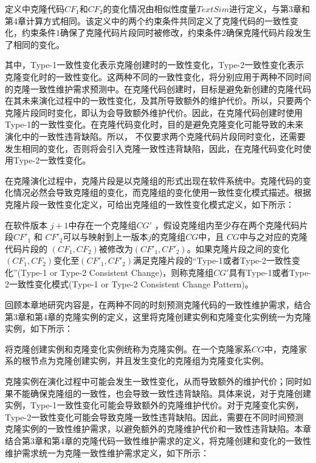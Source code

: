 定义中克隆代码$ CF_1 $和$ CF_2 $的变化情况由相似性度量$ \mathit {TextSim} $进行定义，与第3章和第4章计算方式相同。该定义中的两个约束条件共同定义了克隆代码的一致性变化，约束条件$1$确保了克隆代码片段同时被修改，约束条件$2$确保克隆代码片段发生了相同的变化。

其中，Type-1一致性变化表示克隆创建时的一致性变化，Type-2一致性变化表示克隆变化时的一致性变化。这两种不同的一致性变化，将分别应用于两种不同时间的克隆一致性维护需求预测中。在克隆代码创建时，目标是避免新创建的克隆代码在其未来演化过程中的一致性变化，及其所导致额外的维护代价。所以，只要两个克隆片段同时变化，即认为会导致额外维护代价。因此，在克隆代码创建时使用Type-1的一致性变化。在克隆代码变化时，目的是避免克隆变化可能导致的未来演化中的一致性违背缺陷。所以， 不仅要求两个克隆代码片段同时变化，还需要发生相同的变化，否则将会引入克隆一致性违背缺陷，因此，在克隆代码变化时使用Type-2一致性变化。

在克隆演化过程中，克隆片段是以克隆组的形式出现在软件系统中。克隆代码的变化情况必然会导致克隆组的变化，而克隆组的变化使用一致性变化模式描述。根据克隆片段一致性变化定义，可给出克隆组的一致性变化模式定义，如下所示：

\begin{definition}[克隆一致性变化模式] 
\label{def-pattern}
在软件版本 $j+1$中存在一个克隆组$CG'$ ，假设克隆组内至少存在两个克隆代码片段$CF'_1$ 和 $CF'_2$可以与映射到上一版本$j$的克隆组$CG$中，且 $CG$中与之对应的克隆代码片段的 $(CF_1,CF_2)$被修改为$(CF'_1,CF'_2)$。如果克隆片段之间的变化 $(CF_1,CF_2)$变化至$(CF'_1,CF'_2)$满足克隆片段的“Type-1或者Type-2一致性变化”(Type-1 or Type-2 Consistent Change)，则称克隆组$CG'$具有Type-1或者Type-2一致性变化模式(Type-1 or  Type-2 Consistent Change Pattern)。
\end{definition}

回顾本章地研究内容是，在两种不同的时刻预测克隆代码的一致性维护需求，结合第3章和第4章的克隆实例的定义，这里将克隆创建实例和克隆变化实例统一为克隆实例，如下所示：

\begin{definition}[克隆实例] 
\label{def-instance}
将克隆创建实例和克隆变化实例统称为克隆实例。在一个克隆家系$CG$中，克隆家系的根节点为克隆创建实例，并且发生变化的克隆组为克隆变化实例。
\end{definition}

克隆实例在演化过程中可能会发生一致性变化，从而导致额外的维护代价；同时如果不能确保克隆组的一致性，也会导致一致性违背缺陷。具体来说，对于克隆创建实例，Type-1一致性变化可能会导致额外的克隆维护代价。对于克隆变化实例，Type-2一致性变化可能会导致克隆一致性违背缺陷。因此，需要在不同时间预测克隆实例的一致性维护需求，以避免额外的克隆维护代价和一致性违背缺陷。本章结合第3章和第4章的克隆代码一致性维护需求的定义，将克隆创建和变化的一致性维护需求统一为克隆一致性维护需求定义，如下所示：

